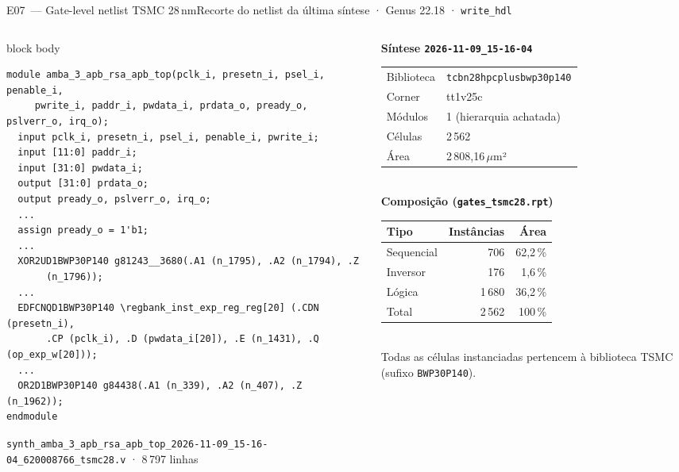 \documentclass[aspectratio=169,10pt,t]{beamer}
\begin{document}
\begin{frame}[fragile]{E07~— Gate-level netlist TSMC 28\,nm}{Recorte do netlist da última síntese · Genus 22.18 · \texttt{write\_hdl}}
\begin{columns}[T]
\begin{column}{0.63\textwidth}
\begin{beamercolorbox}[rounded=true,shadow=false,sep=3pt]{block body}
\begin{verbatim}
module amba_3_apb_rsa_apb_top(pclk_i, presetn_i, psel_i, penable_i,
     pwrite_i, paddr_i, pwdata_i, prdata_o, pready_o, pslverr_o, irq_o);
  input pclk_i, presetn_i, psel_i, penable_i, pwrite_i;
  input [11:0] paddr_i;
  input [31:0] pwdata_i;
  output [31:0] prdata_o;
  output pready_o, pslverr_o, irq_o;
  ...
  assign pready_o = 1'b1;
  ...
  XOR2UD1BWP30P140 g81243__3680(.A1 (n_1795), .A2 (n_1794), .Z
       (n_1796));
  ...
  EDFCNQD1BWP30P140 \regbank_inst_exp_reg_reg[20] (.CDN (presetn_i),
       .CP (pclk_i), .D (pwdata_i[20]), .E (n_1431), .Q (op_exp_w[20]));
  ...
  OR2D1BWP30P140 g84438(.A1 (n_339), .A2 (n_407), .Z (n_1962));
endmodule
\end{verbatim}
\vspace*{-0.6\baselineskip}
      \end{beamercolorbox}
      {\tiny \texttt{synth\_amba\_3\_apb\_rsa\_apb\_top\_2026-11-09\_15-16-04\_620008766\_tsmc28.v} · 8\,797 linhas}
    \end{column}
    \begin{column}{0.35\textwidth}
      \scriptsize
      \textbf{\color{tmCafe}Síntese \texttt{2026-11-09\_15-16-04}}\\[0.1cm]
      \begin{tabular}{@{}ll@{}}
        \toprule
        Biblioteca & \texttt{tcbn28hpcplusbwp30p140} \\
        Corner & tt1v25c \\
        Módulos & 1 (hierarquia achatada) \\
        Células & 2\,562 \\
        Área & 2\,808,16\,$\mu$m² \\
        \bottomrule
      \end{tabular}\\[0.2cm]
      \textbf{\color{tmCafe}Composição (\texttt{gates\_tsmc28.rpt})}\\[0.1cm]
      \begin{tabular}{@{}lrr@{}}
        \toprule
        Tipo & Instâncias & Área \\
        \midrule
        Sequencial & 706 & 62,2\,\% \\
        Inversor & 176 & 1,6\,\% \\
        Lógica & 1\,680 & 36,2\,\% \\
        \midrule
        Total & 2\,562 & 100\,\% \\
        \bottomrule
      \end{tabular}\\[0.2cm]
      {\tiny Todas as células instanciadas pertencem à biblioteca TSMC (sufixo \texttt{BWP30P140}).}
    \end{column}
  \end{columns}
\end{frame}
\end{document}
